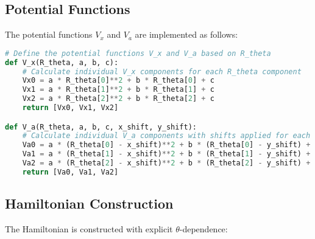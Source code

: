 \documentclass[12pt,a4paper]{article}
\begin{document}
\subsection{Potential Functions}

The potential functions $V_x$ and $V_a$ are implemented as follows:

\begin{lstlisting}[language=Python, caption=Potential functions]
# Define the potential functions V_x and V_a based on R_theta
def V_x(R_theta, a, b, c):
    # Calculate individual V_x components for each R_theta component
    Vx0 = a * R_theta[0]**2 + b * R_theta[0] + c
    Vx1 = a * R_theta[1]**2 + b * R_theta[1] + c
    Vx2 = a * R_theta[2]**2 + b * R_theta[2] + c
    return [Vx0, Vx1, Vx2]

def V_a(R_theta, a, b, c, x_shift, y_shift):
    # Calculate individual V_a components with shifts applied for each R_theta component
    Va0 = a * (R_theta[0] - x_shift)**2 + b * (R_theta[0] - y_shift) + c
    Va1 = a * (R_theta[1] - x_shift)**2 + b * (R_theta[1] - y_shift) + c
    Va2 = a * (R_theta[2] - x_shift)**2 + b * (R_theta[2] - y_shift) + c
    return [Va0, Va1, Va2]
\end{lstlisting}

\subsection{Hamiltonian Construction}

The Hamiltonian is constructed with explicit $\theta$-dependence:
\end{document}
